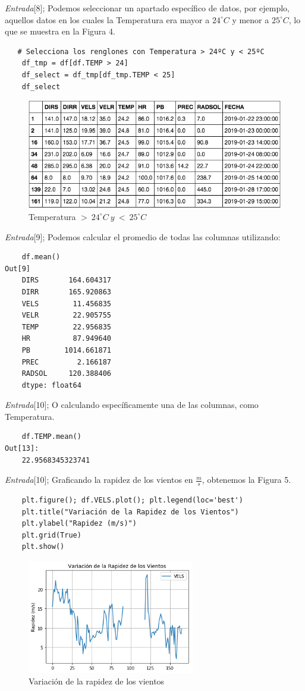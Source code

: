 \documentclass[11pt, spanish]{report}
\begin{document}
\emph{Entrada}[8]; Podemos seleccionar un apartado específico de datos, por ejemplo, aquellos datos en los cuales la Temperatura era mayor a $24^\circ C$ y menor a $25^\circ C$, lo que se muestra en la Figura 4.
\begin{verbatim}
   # Selecciona los renglones con Temperatura > 24ºC y < 25ºC
    df_tmp = df[df.TEMP > 24] 
    df_select = df_tmp[df_tmp.TEMP < 25]
    df_select 
\end{verbatim}
\begin{figure}[h]
\caption{Temperatura $>\ 24^\circ C \ y \ < \ 25^\circ C$}
\centering
\includegraphics[width=\textwidth]{temp24-25.png}
\end{figure}

\emph{Entrada}[9]; Podemos calcular el promedio de todas las columnas utilizando:
\begin{verbatim}
    df.mean()
Out[9]
    DIRS       164.604317
    DIRR       165.920863
    VELS        11.456835
    VELR        22.905755
    TEMP        22.956835
    HR          87.949640
    PB        1014.661871
    PREC         2.166187
    RADSOL     120.388406
    dtype: float64
\end{verbatim}

\emph{Entrada}[10]; O calculando específicamente una de las columnas, como Temperatura.
\begin{verbatim}
    df.TEMP.mean()
Out[13]:
    22.9568345323741
\end{verbatim}

\emph{Entrada}[10]; Graficando la rapidez de los vientos en $\frac{m}{s}$, obtenemos la Figura 5.
\begin{verbatim}
    plt.figure(); df.VELS.plot(); plt.legend(loc='best')
    plt.title("Variación de la Rapidez de los Vientos")
    plt.ylabel("Rapidez (m/s)")
    plt.grid(True)
    plt.show()
\end{verbatim}
\begin{figure}[h]
\caption{Variación de la rapidez de los vientos}
\centering
\includegraphics[width=0.65\textwidth]{rapidez.png}
\end{figure}
\end{document}
